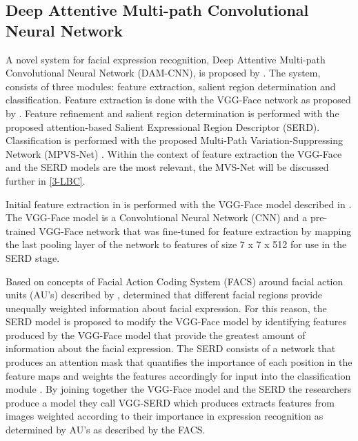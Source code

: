 \subsection{Deep Attentive Multi-path Convolutional Neural Network}
A novel system for facial expression recognition, Deep Attentive Multi-path Convolutional Neural Network (DAM-CNN), is proposed by \cite{xie2019deep}. The system, consists of three modules: feature extraction, salient region determination and classification. Feature extraction is done with the VGG-Face network as proposed by \cite{parkhi2015deep}. Feature refinement and salient region determination is performed with the proposed attention-based Salient Expressional Region Descriptor (SERD)\cite{xie2019deep}. Classification is performed with the proposed Multi-Path Variation-Suppressing Network (MPVS-Net) \cite{xie2019deep}. Within the context of feature extraction the VGG-Face and the SERD models are the most relevant, the MVS-Net will be discussed further in \ref{3-LBC}.

Initial feature extraction in \cite{xie2019deep} is performed with the VGG-Face model described in \cite{parkhi2015deep}. The VGG-Face model is a Convolutional Neural Network (CNN) and a pre-trained VGG-Face network that was fine-tuned for feature extraction by mapping the last pooling layer of the network to features of size 7 x 7 x 512 \cite{xie2019deep} for use in the SERD stage.

Based on concepts of Facial Action Coding System (FACS) around facial action units (AU's) described by \cite{friesen1978facial}, \cite{xie2019deep} determined that different facial regions provide unequally weighted information about facial expression. For this reason, the SERD model is proposed to modify the VGG-Face model by identifying features produced by the VGG-Face model that provide the greatest amount of information about the facial expression. The SERD consists of a network that produces an attention mask that quantifies the importance of each position in the feature maps and weights the features accordingly for input into the classification module \cite{xie2019deep}.
By joining together the VGG-Face model and the SERD the researchers produce a model they call VGG-SERD which produces extracts features from images weighted according to their importance in expression recognition as determined by AU's as described by the FACS.


